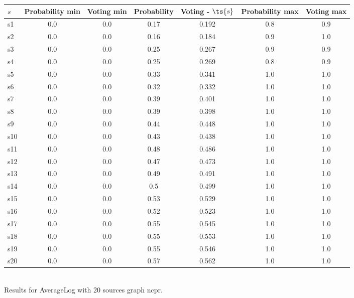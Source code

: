 \documentclass{article}
\begin{document}
\noindent\begin{tabular}{|l|c|c|c|c|c|c|}
\hline
$s$& Probability min & Voting min & Probability & Voting - $\ts{s}$ & Probability max & Voting max\\
\hline
s1 &0.0 & 0.0 & 0.17 & 0.192 & 0.8 & 0.9\\
\hline
s2 &0.0 & 0.0 & 0.16 & 0.184 & 0.9 & 1.0\\
\hline
s3 &0.0 & 0.0 & 0.25 & 0.267 & 0.9 & 0.9\\
\hline
s4 &0.0 & 0.0 & 0.25 & 0.269 & 0.8 & 0.9\\
\hline
s5 &0.0 & 0.0 & 0.33 & 0.341 & 1.0 & 1.0\\
\hline
s6 &0.0 & 0.0 & 0.32 & 0.332 & 1.0 & 1.0\\
\hline
s7 &0.0 & 0.0 & 0.39 & 0.401 & 1.0 & 1.0\\
\hline
s8 &0.0 & 0.0 & 0.39 & 0.398 & 1.0 & 1.0\\
\hline
s9 &0.0 & 0.0 & 0.44 & 0.448 & 1.0 & 1.0\\
\hline
s10 &0.0 & 0.0 & 0.43 & 0.438 & 1.0 & 1.0\\
\hline
s11 &0.0 & 0.0 & 0.48 & 0.486 & 1.0 & 1.0\\
\hline
s12 &0.0 & 0.0 & 0.47 & 0.473 & 1.0 & 1.0\\
\hline
s13 &0.0 & 0.0 & 0.49 & 0.491 & 1.0 & 1.0\\
\hline
s14 &0.0 & 0.0 & 0.5 & 0.499 & 1.0 & 1.0\\
\hline
s15 &0.0 & 0.0 & 0.53 & 0.529 & 1.0 & 1.0\\
\hline
s16 &0.0 & 0.0 & 0.52 & 0.523 & 1.0 & 1.0\\
\hline
s17 &0.0 & 0.0 & 0.55 & 0.545 & 1.0 & 1.0\\
\hline
s18 &0.0 & 0.0 & 0.55 & 0.553 & 1.0 & 1.0\\
\hline
s19 &0.0 & 0.0 & 0.55 & 0.546 & 1.0 & 1.0\\
\hline
s20 &0.0 & 0.0 & 0.57 & 0.562 & 1.0 & 1.0\\
\hline
\end{tabular}\\

\noindent Results for AverageLog with 20 sources graph ncpr.
\end{document}
